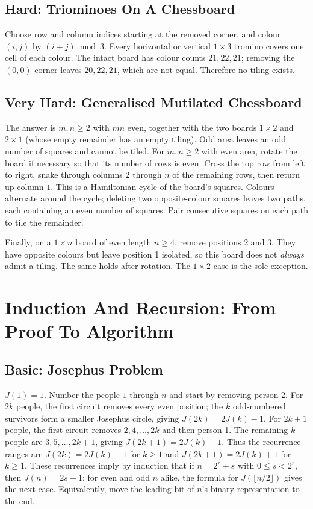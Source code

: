 \documentclass[12pt]{article}
\begin{document}
\subsection*{Hard: Triominoes On A Chessboard}
Choose row and column indices starting at the removed corner, and
colour $(i,j)$ by $(i+j)\bmod3$. Every horizontal or vertical
$1\times3$ tromino covers one cell of each colour. The intact board
has colour counts $21,22,21$; removing the $(0,0)$ corner leaves
$20,22,21$, which are not equal. Therefore no tiling exists.

\subsection*{Very Hard: Generalised Mutilated Chessboard}
The answer is $m,n\ge2$ with $mn$ even, together with the two boards
$1\times2$ and $2\times1$ (whose empty remainder has an empty tiling).
Odd area leaves an odd number of squares and cannot be tiled. For
$m,n\ge2$ with even area, rotate the board if necessary so that its
number of rows is even. Cross the top row from left to right, snake
through columns $2$ through $n$ of the remaining rows, then return
up column $1$. This is a Hamiltonian cycle of the board's squares.
Colours alternate around the cycle; deleting two opposite-colour
squares leaves two paths, each containing an even number of squares.
Pair consecutive squares on each path to tile the remainder.

Finally, on a $1\times n$ board of even length $n\ge4$, remove
positions 2 and 3. They have opposite colours but leave position 1
isolated, so this board does not \emph{always} admit a tiling. The
same holds after rotation. The $1\times2$ case is the sole exception.

\section{Induction And Recursion: From Proof To Algorithm}

\subsection*{Basic: Josephus Problem}
$J(1)=1$. Number the people $1$ through $n$ and start by removing
person 2. For $2k$ people, the first circuit removes every even
position; the $k$ odd-numbered survivors form a smaller Josephus
circle, giving $J(2k)=2J(k)-1$. For $2k+1$ people, the first circuit
removes $2,4,\ldots,2k$ and then person 1. The remaining $k$ people
are $3,5,\ldots,2k+1$, giving $J(2k+1)=2J(k)+1$.
Thus the recurrence ranges are $J(2k)=2J(k)-1$ for $k\ge1$ and
$J(2k+1)=2J(k)+1$ for $k\ge1$.
These recurrences imply by induction that if $n=2^r+s$ with
$0\le s<2^r$, then $J(n)=2s+1$: for even and odd $n$ alike, the
formula for $J(\lfloor n/2\rfloor)$ gives the next case.
Equivalently, move the leading bit of $n$'s binary representation
to the end.
\end{document}
